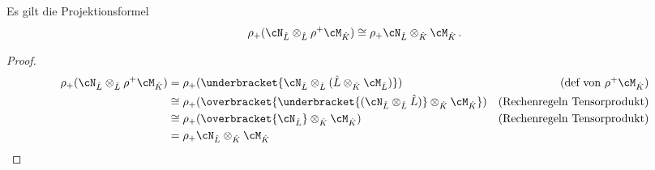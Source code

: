 \begin{thm} \label{thm:Projektionsformel}
\cite[1.a]{sabbah_Fourier-local}
Es gilt die Projektionsformel
\begin{equation} \label{eq:Projektionsformel}
\rho_+(\cN_{\hat L}\otimes_{\hat L}\rho^+\cM_{\hat K}) \cong
\rho_+\cN_{\hat L}\otimes_{\hat K}\cM_{\hat K}\,.
\end{equation}
\end{thm}
\begin{proof}
\begin{align*}
\rho_+(\cN_{\hat L}\otimes_{\hat L}\rho^+\cM_{\hat K}) &=
\rho_+(\underbracket{\cN_{\hat L}\otimes_{\hat L}(\hat L\otimes_{\hat
  K}\cM_{\hat L})})
  & \mbox{(def von $\rho^+\cM_{\hat K}$)}\\
&\cong\rho_+(\overbracket{\underbracket{(\cN_{\hat L}\otimes_{\hat L}\hat L)}
  \otimes_{\hat K}\cM_{\hat K}})
  & \mbox{(Rechenregeln Tensorprodukt)}\\ %
&\cong \rho_+(\overbracket{\cN_{\hat L}}\otimes_{\hat K}\cM_{\hat K})
  & \mbox{(Rechenregeln Tensorprodukt)}\\
&= \rho_+\cN_{\hat L}\otimes_{\hat K}\cM_{\hat K}
\end{align*}
\end{proof}

